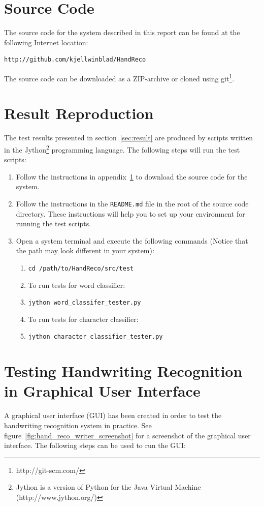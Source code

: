 
\section{Source Code}\label{app:source_code}

The source code for the system described in this report can be found at the following Internet location:

\begin{verbatim}
http://github.com/kjellwinblad/HandReco
\end{verbatim}

The source code can be downloaded as a ZIP-archive or cloned using git\footnote{http://git-scm.com/}.

\section{Result Reproduction}\label{app:result_reproduction} 

The test results presented in section~\ref{sec:result} are produced by scripts written in the Jython\footnote{Jython is a version of Python for the Java Virtual Machine (http://www.jython.org/)} programming language. The following steps will run the test scripts:

\begin{enumerate}
 \item Follow the instructions in appendix~\ref{app:source_code} to download the source code for the system.
 \item Follow the instructions in the \verb|README.md| file in the root of the source code directory. These instructions will help you to set up your environment for running the test scripts.
 \item Open a system terminal and execute the following commands (Notice that the path may look different in your system):
 \begin{enumerate}
  \item \verb|cd /path/to/HandReco/src/test|
  \item To run tests for word classifier:
  \item \verb|jython word_classifer_tester.py|
  \item To run tests for character classifier:
  \item \verb|jython character_classifier_tester.py|
 \end{enumerate}
\end{enumerate}

\section{Testing Handwriting Recognition in Graphical User Interface}
A graphical user interface (GUI) has been created in order to test the handwriting recognition system in practice. See figure~\ref{fig:hand_reco_writer_screenshot} for a screenshot of the graphical user interface. The following steps can be used to run the GUI:


